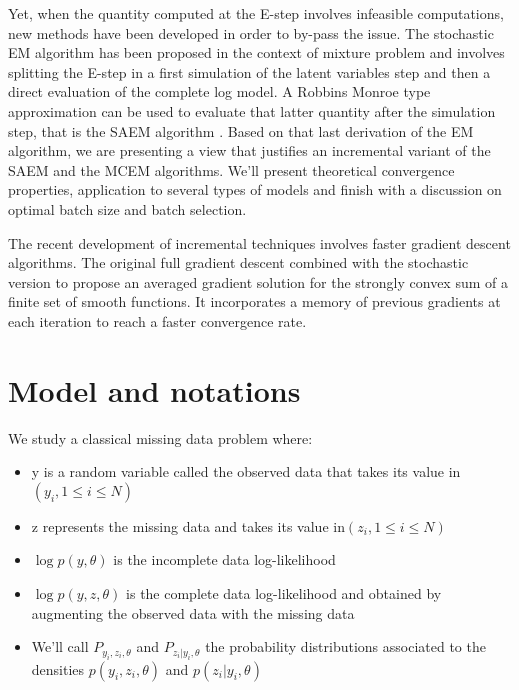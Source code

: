 \documentclass{article}
\theoremstyle{plain}
\theoremstyle{plain}
\theoremstyle{definition}
\begin{document}
Yet, when the quantity computed at the E-step involves infeasible computations, new methods have been developed in order to by-pass the issue. The stochastic EM algorithm \citep{diebolt} has been proposed in the context of mixture problem and involves splitting the E-step in a first simulation of the latent variables step and then a direct evaluation of the complete log model. A Robbins Monroe type approximation can be used to evaluate that latter quantity after the simulation step, that is the SAEM algorithm \citep{lavielle2,moulines}.
Based on that last derivation of the EM algorithm, we are presenting a view that justifies an incremental variant of the SAEM and the MCEM algorithms. We'll present theoretical convergence properties, application to several types of models and finish with a discussion on optimal batch size and batch selection.

The recent development of incremental techniques involves faster gradient descent algorithms. The original full gradient descent combined with the stochastic version to propose an averaged gradient solution \citep{bach, roux} for the strongly convex sum of a finite set of smooth functions. It incorporates a memory of previous gradients at each iteration to reach a faster convergence rate.




\section{Model and notations}
We study a classical missing data problem where:
\begin{itemize}
\item y is a random variable called the observed data that takes its value in $(y_i, 1\leq i \leq N)$
\item z represents the missing data and takes its value in$(z_i, 1\leq i \leq N)$
\item $\log p(y,\theta)$ is the incomplete data log-likelihood
\item $\log p(y,z,\theta)$ is the complete data log-likelihood and obtained by augmenting the observed data with the missing data
\item We'll call $P_{y_i,z_i,\theta}$ and $P_{z_i|y_i,\theta}$ the probability distributions associated to the densities $p(y_i,z_i,\theta)$ and $p(z_i|y_i,\theta)$
\end{itemize}
\end{document}
